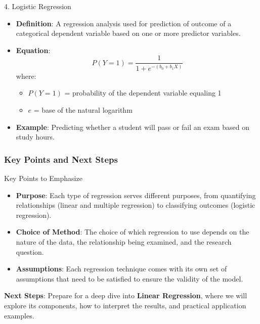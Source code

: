 \documentclass{beamer}
\begin{document}
\begin{frame}[fragile]
    \begin{block}{4. Logistic Regression}
        \begin{itemize}
            \item \textbf{Definition}: A regression analysis used for prediction of outcome of a categorical dependent variable based on one or more predictor variables.
            \item \textbf{Equation}:
            \begin{equation}
            P(Y=1) = \frac{1}{1 + e^{-(b_0 + b_1X)}}
            \end{equation}
            where:
            \begin{itemize}
                \item $P(Y=1)$ = probability of the dependent variable equaling 1
                \item $e$ = base of the natural logarithm
            \end{itemize}
            \item \textbf{Example}: Predicting whether a student will pass or fail an exam based on study hours.
        \end{itemize}
    \end{block}
\end{frame}

\begin{frame}[fragile]
    \frametitle{Key Points and Next Steps}
    \begin{block}{Key Points to Emphasize}
        \begin{itemize}
            \item \textbf{Purpose}: Each type of regression serves different purposes, from quantifying relationships (linear and multiple regression) to classifying outcomes (logistic regression).
            \item \textbf{Choice of Method}: The choice of which regression to use depends on the nature of the data, the relationship being examined, and the research question.
            \item \textbf{Assumptions}: Each regression technique comes with its own set of assumptions that need to be satisfied to ensure the validity of the model.
        \end{itemize}
    \end{block}
    
    \textbf{Next Steps}: Prepare for a deep dive into \textbf{Linear Regression}, where we will explore its components, how to interpret the results, and practical application examples.
\end{frame}
\end{document}
